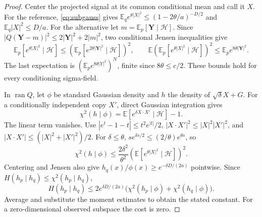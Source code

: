 \documentclass[11pt]{article}
\theoremstyle{remark}\newtheorem{remark}[theorem]{Remark}
\newcommand{\E}{\mathbb E}
\begin{document}
\begin{proof}
Center the projected signal at its common conditional mean and call it $X$.
For the reference, \eqref{eq:subgauss} gives
$\E_q e^{\theta|X|^2}\le(1-2\theta/a)^{-D/2}$ and
$\E_q|X|^2\le D/a$.
For the alternative let $m=\E_p[\mathbf Y\mid\mathcal H]$.
Since $|Q(\mathbf Y-m)|^2\le2|\mathbf Y|^2+2|m|^2$, two conditional
Jensen inequalities give
\[
\E_p[e^{\theta|X|^2}\mid\mathcal H]
\le(\E_p[e^{2\theta|\mathbf Y|^2}\mid\mathcal H])^2,\qquad
\E(\E_p[e^{\theta|X|^2}\mid\mathcal H])^2
\le\E_p e^{8\theta|\mathbf Y|^2}.
\]
The last expectation is $(\E_p e^{8\theta|Y|^2})^N$, finite since
$8\theta\le c/2$. These bounds hold for every conditioning sigma-field.

In $\operatorname{ran}Q$, let $\phi$ be standard Gaussian density and $h$
the density of $\sqrt\delta X+G$. For a conditionally independent copy $X'$,
direct Gaussian integration gives
\[
\chi^2(h\mid\phi)=\E[e^{\delta X\cdot X'}\mid\mathcal H]-1.
\]
The linear term vanishes. Use
$|e^t-1-t|\le t^2e^{|t|}/2$,
$|X\cdot X'|^2\le|X|^2|X'|^2$, and
$|X\cdot X'|\le(|X|^2+|X'|^2)/2$.
For $\delta\le\theta$, $s e^{\delta s/2}\le(2/\theta)e^{\theta s}$,
so
\[
\chi^2(h\mid\phi)
\le\frac{2\delta^2}{\theta^2}
(\E[e^{\theta|X|^2}\mid\mathcal H])^2.
\]
Centering and Jensen also give
$h_q(x)/\phi(x)\ge e^{-\delta D/(2a)}$ pointwise.
Since $H(h_p\mid h_q)\le\chi^2(h_p\mid h_q)$,
\[
H(h_p\mid h_q)
\le2e^{\delta D/(2a)}
\bigl(\chi^2(h_p\mid\phi)+\chi^2(h_q\mid\phi)\bigr).
\]
Average and substitute the moment estimates to obtain the stated constant.
For a zero-dimensional observed subspace the cost is zero.
\end{proof}
\end{document}
